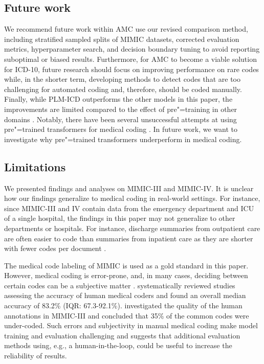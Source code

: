 {\subsection{Future work}
We recommend future work within AMC use our revised comparison method, including stratified sampled splits of MIMIC datasets, corrected evaluation metrics, hyperparameter search, and decision boundary tuning to avoid reporting suboptimal or biased results. 
Furthermore, for AMC to become a viable solution for ICD-10, future research should focus on improving performance on rare codes while, in the shorter term, developing methods to detect codes that are too challenging for automated coding and, therefore, should be coded manually. Finally, while PLM-ICD outperforms the other models in this paper, the improvements are limited compared to the effect of pre"=training in other domains \parencite{mohamed_selfsupervised_2022, linPretrainedTransformersText2021,baevski_wav2vec_2020,devlin_bert_2018,dosovitskiy_image_2021}.
Notably, there have been several unsuccessful attempts at using pre"=trained transformers for medical coding \parencite{jiDoesMagicBERT2021,gaoLimitationsTransformersClinical2021,michalopoulosICDBigBirdContextualEmbedding2022,pascualBERTbasedAutomaticICD2021,zhangBERTXMLLargeScale2020}. In future work, we want to investigate why pre"=trained transformers underperform in medical coding.


\subsection{Limitations}
We presented findings and analyses on MIMIC-III and MIMIC-IV. It is unclear how our findings generalize to medical coding in real-world settings. 
For instance, since MIMIC-III and IV contain data from the emergency department and ICU of a single hospital, the findings in this paper may not generalize to other departments or hospitals. 
For instance, discharge summaries from outpatient care are often easier to code than summaries from inpatient care as they are shorter with fewer codes per document \parencite{zhangBERTXMLLargeScale2020, liuEffectiveConvolutionalAttention2021, tsengAdministrativeCostsAssociated2018}.

The medical code labeling of MIMIC is used as a gold standard in this paper. However, medical coding is error-prone, and, in many cases, deciding between certain codes can be a subjective matter \parencite{nouraeiAuditNatureImpact2013, lloydPhysicianCodingErrors1985}. \textcite{burnsSystematicReviewDischarge2012} systematically reviewed studies assessing the accuracy of human medical coders and found an overall median accuracy of 83.2\% (IQR: 67.3-92.1\%). \textcite{searleExperimentalEvaluationDevelopment2020} investigated the quality of the human annotations in MIMIC-III and concluded that 35\% of the common codes were under-coded. Such errors and subjectivity in manual medical coding make model training and evaluation challenging and suggests that additional evaluation methods using, e.g., a human-in-the-loop, could be useful to increase the reliability of results. 

}
